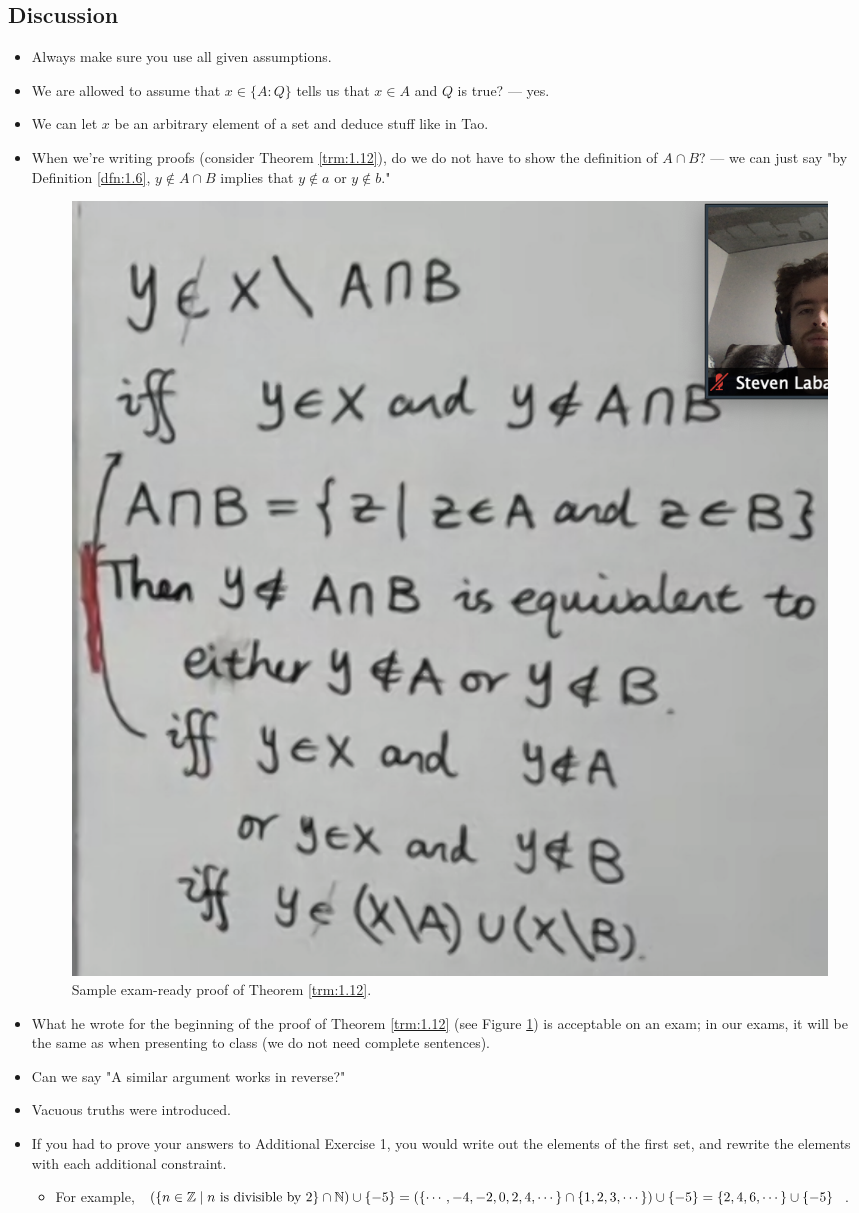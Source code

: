 \documentclass[titlepage]{article}
\begin{document}
\subsection{Discussion}
\begin{itemize}
    \item {}Always make sure you use all given assumptions.
    \item We are allowed to assume that $x\in\{A:Q\}$ tells us that $x\in A$ and $Q$ is true? --- yes.
    \item We can let $x$ be an arbitrary element of a set and deduce stuff like in Tao.
    \item When we're writing proofs (consider Theorem \ref{trm:1.12}), do we do not have to show the definition of $A\cap B$? --- we can just say "by Definition \ref{dfn:1.6}, $y\notin A\cap B$ implies that $y\notin a$ or $y\notin b$."
    \begin{figure}[h!]
        \centering
        \includegraphics[width=0.3\linewidth]{ExtFiles/SampleTrm1-12Proof.png}
        \caption{Sample exam-ready proof of Theorem \ref{trm:1.12}.}
        \label{fig:sampleTrm1-12Proof}
    \end{figure}
    \item What he wrote for the beginning of the proof of Theorem \ref{trm:1.12} (see Figure \ref{fig:sampleTrm1-12Proof}) is acceptable on an exam; in our exams, it will be the same as when presenting to class (we do not need complete sentences).
    \item Can we say "A similar argument works in reverse?"
    \item {}Vacuous truths were introduced.
    \item If you had to prove your answers to Additional Exercise 1, you would write out the elements of the first set, and rewrite the elements with each additional constraint.
    \begin{itemize}
        \item For example, $(\{n\in\mathbb{Z}\mid n\text{ is divisible by }2\}\cap\mathbb{N})\cup\{-5\}=(\{\cdots,-4,-2,0,2,4,\cdots\}\cap\{1,2,3,\cdots\})\cup\{-5\}=\{2,4,6,\cdots\}\cup\{-5\}$.

\end{itemize}
\end{itemize}
\end{document}

